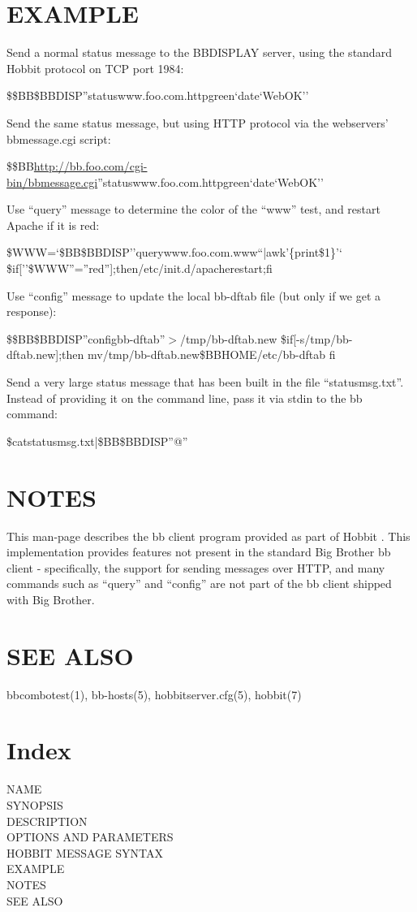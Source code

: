 \section{EXAMPLE}


  Send a normal status message to the BBDISPLAY server, using the standard Hobbit protocol on TCP port 1984:  
 
\$\$BB\$BBDISP''statuswww.foo.com.httpgreen`date`WebOK'' 


  Send the same status message, but using HTTP protocol via the webservers' bbmessage.cgi script:  
 
\$\$BB\url{http://bb.foo.com/cgi-bin/bbmessage.cgi}''statuswww.foo.com.httpgreen`date`WebOK'' 


  Use ``query'' message to determine the color of the ``www'' test, and restart Apache if it is red:  



  
\$WWW=`\$BB\$BBDISP''querywww.foo.com.www``|awk'\{print\$1\}'`  \$if[''\$WWW''=''red''];then/etc/init.d/apacherestart;fi 


  Use ``config'' message to update the local bb-dftab file (but only if we get a response):  



  
\$\$BB\$BBDISP''configbb-dftab''$>$/tmp/bb-dftab.new  
\$if[-s/tmp/bb-dftab.new];then  
mv/tmp/bb-dftab.new\$BBHOME/etc/bb-dftab  
fi 


  Send a very large status message that has been built in the file
  ``statusmsg.txt''. Instead of providing it on the command line, pass
  it via stdin to the bb command: 



  
\$catstatusmsg.txt|\$BB\$BBDISP''@'' 


 
\section{NOTES}
 This man-page describes the bb client program provided as part of
 Hobbit . This implementation provides features not present in the
 standard Big Brother bb client - specifically, the support for
 sending messages over HTTP, and many commands such as ``query'' and
 ``config'' are not part of the bb client shipped with Big Brother. 


 
\section{SEE ALSO}

bbcombotest(1), bb-hosts(5), hobbitserver.cfg(5), hobbit(7) 
  

\section{Index}
\begin{description}
\item[NAME]
\item[SYNOPSIS]
\item[DESCRIPTION]
\item[OPTIONS AND PARAMETERS]
\item[HOBBIT MESSAGE SYNTAX]
\item[EXAMPLE]
\item[NOTES]
\item[SEE ALSO]

\end{description}

